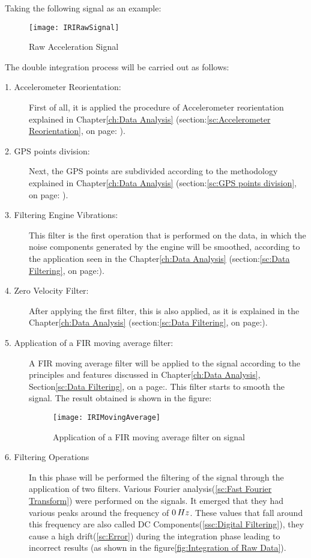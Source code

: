 \documentclass[tesi]{subfiles}
\begin{document}
Taking the following signal as an example:


\begin{figure}[H]
\centering
\texttt{[image: IRIRawSignal]}
\caption{Raw Acceleration Signal}
\end{figure}
The double integration process will be carried out as follows:



\begin{description}
\item[1. Accelerometer Reorientation:] First of all, it is applied the procedure of Accelerometer reorientation explained in Chapter\ref{ch:Data Analysis} (section:\ref{sc:Accelerometer Reorientation}, on page: \pageref{sc:Accelerometer Reorientation}).
\item[2. GPS points division:] Next, the GPS points are subdivided according to the methodology explained in Chapter\ref{ch:Data Analysis} (section:\ref{sc:GPS points division}, on page: \pageref{sc:GPS points division}).
\item[3. Filtering Engine Vibrations:] This filter is the first operation that is performed on the data, in which the noise components generated by the engine will be smoothed, according to the application seen in the Chapter\ref{ch:Data Analysis} (section:\ref{sc:Data Filtering}, on page:\pageref{sssc:Remove Engine Vibrations Filter}).
\item[4. Zero Velocity Filter:] After applying the first filter, this is also applied, as it is explained in the Chapter\ref{ch:Data Analysis} (section:\ref{sc:Data Filtering}, on page:\pageref{sssc:Zero Velocity Filter}).
\item[5. Application of a FIR moving average filter:] A FIR moving average filter will be applied to the signal according to the principles and features discussed in Chapter\ref{ch:Data Analysis}, Section\ref{sc:Data Filtering}, on a page:\pageref{p:moving_average}.
This filter starts to smooth the signal.
The result obtained is shown in the figure:
\begin{figure}[H]
\centering
\texttt{[image: IRIMovingAverage]}
\caption{Application of a FIR moving average filter on signal}
\end{figure}
\item[6. Filtering Operations]
In this phase will be performed the filtering of the signal through the application of two filters.
Various Fourier analysis(\ref{sc:Fast Fourier Transform}) were performed on the signals.
It emerged that they had various peaks around the frequency of $0 \thinspace Hz$. These values that fall around this frequency are also called DC Components(\ref{ssc:Digital Filtering}), they cause a high drift(\ref{sc:Error}) during the integration phase leading to incorrect results (as shown in the figure\ref{fig:Integration of Raw Data}).

\end{description}
\end{document}
